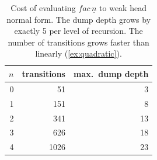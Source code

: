 \documentclass[11pt,a4paper]{article}
\theoremstyle{definition}
\theoremstyle{plain}
\begin{document}
\begin{table}[t]
\centering
\begin{tabular}{rrr}
\toprule
$n$ & transitions & max.\ dump depth\\
\midrule
0 & 51 & 3\\
1 & 151 & 8\\
2 & 341 & 13\\
3 & 626 & 18\\
4 & 1026 & 23\\
\bottomrule
\end{tabular}
\caption{Cost of evaluating $\mathit{fac}\,\underline{n}$ to weak head normal
form. The dump depth grows by exactly 5 per level of recursion. The
number of transitions grows faster than linearly (\cref{ex:quadratic}).}
\label{tab:fac}
\end{table}
\end{document}
